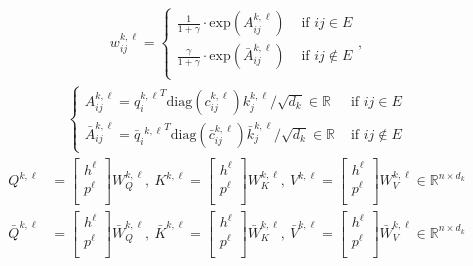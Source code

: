 \documentclass{article} \usepackage{iclr2021_conference,times}
\begin{document}
\begin{eqnarray}
w_{ij}^{k,\ell}=\left\{\begin{array}{ll}
\frac{1}{1+\gamma} \cdot \text{exp}(A_{ij}^{k,\ell}) & \textrm{ if } ij\in E  \\
\frac{\gamma}{1+\gamma} \cdot \text{exp}(\bar{A}_{ij}^{k,\ell}) & \textrm{ if } ij\not\in E \\
\end{array}\right.,\label{eqn:san_lspe_3a}
\end{eqnarray}
\begin{eqnarray}
\left\{
\begin{array}{ll}
A_{ij}^{k,\ell}={q_i^{k,\ell}}^T \textrm{diag}(c_{ij}^{k,\ell}) k_j^{k,\ell} / \sqrt{d_k}\in\mathbb{R} & \textrm{ if } ij\in E \\
\bar{A}_{ij}^{k,\ell}=\bar{q}_i{{}^{k,\ell}}^T\textrm{diag}({\bar{c}}_{ij}^{k,\ell}) {\bar{k}}_j^{k,\ell} / \sqrt{d_k}\in\mathbb{R} & \textrm{ if } ij\not\in E 
\end{array}
\right.
\end{eqnarray}
\begin{eqnarray}
Q^{k,\ell} &\!=\! \left[ \!\!\begin{array}{c} h^\ell \\ p^\ell \\ \end{array} \!\!\right] W_{Q}^{k,\ell},\
K^{k,\ell} \!=\! \left[ \!\!\begin{array}{c} h^\ell \\ p^\ell \\ \end{array} \!\!\right] W_{K}^{k,\ell},\
V^{k,\ell} \!=\! \left[ \!\!\begin{array}{c} h^\ell \\ p^\ell \\ \end{array} \!\!\right] W_{V}^{k,\ell}\in\mathbb{R}^{n\times d_k}\\
\bar{Q}^{k,\ell} &\!=\! \left[ \!\!\begin{array}{c} h^\ell \\ p^\ell \\ \end{array} \!\!\right] \bar{W}_{Q}^{k,\ell},\
\bar{K}^{k,\ell} \!=\! \left[ \!\!\begin{array}{c} h^\ell \\ p^\ell \\ \end{array} \!\!\right] \bar{W}_{K}^{k,\ell},\
\bar{V}^{k,\ell} \!=\! \left[ \!\!\begin{array}{c} h^\ell \\ p^\ell \\ \end{array} \!\!\right] \bar{W}_{V}^{k,\ell}\in\mathbb{R}^{n\times d_k}
\end{eqnarray}
\end{document}
